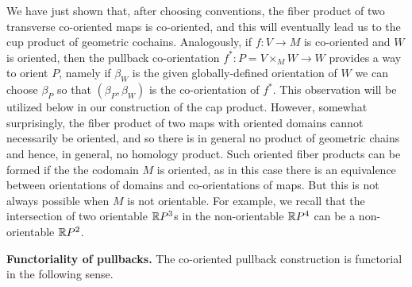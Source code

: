 \begin{remark}\label{R: what products exist}
We have just shown that, after choosing conventions, the fiber product of two transverse co-oriented maps is co-oriented, and this will eventually lead us to the cup product of geometric cochains.
Analogously, if $f:V\to M$ is co-oriented and $W$ is oriented, then the pullback co-orientation $f^*:P=V\times_MW\to W$ provides a way to orient $P$, namely if $\beta_W$ is the given globally-defined orientation of $W$ we can choose $\beta_P$ so that $(\beta_P,\beta_W)$ is the co-orientation of $f^*$. This observation will be utilized below in our construction of the cap product. 
However, somewhat surprisingly, the fiber product of two maps with oriented domains cannot necessarily be oriented, and so there is in general no product of geometric chains and hence, in general, no homology product. Such oriented fiber products can be formed if the the codomain $M$ is oriented, as in this case there is an equivalence between orientations of domains and co-orientations of maps. But this is not always possible when $M$ is not orientable. For example, we recall that the intersection of two orientable $\mathbb{R} P^3$s in the non-orientable $\mathbb{R} P^4$ can be a non-orientable $\mathbb{R} P^2$. 
\end{remark}


\textbf{Functoriality of pullbacks.} The co-oriented pullback construction is functorial in the following sense.



